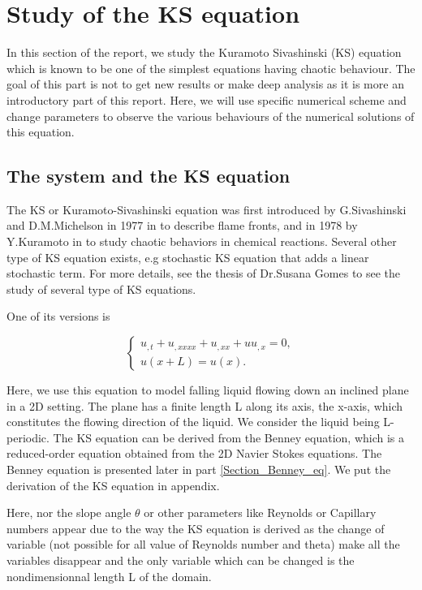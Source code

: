 \documentclass[12pt]{article}
\begin{document}
\newpage
\section{Study of the KS equation}\label{Section_KS_eq}


In this section of the report, we study the Kuramoto Sivashinski (KS) equation which is known to be one of the simplest equations having 
chaotic behaviour.  The goal of this part is not to get new results or make deep analysis as it is more an introductory part of this report. 
Here, we will use specific numerical scheme and change parameters to observe the various behaviours of the numerical solutions of this equation. 

\subsection{The system and the KS equation}

The KS or Kuramoto-Sivashinski equation was first introduced by G.Sivashinski and D.M.Michelson in 1977 in \cite{Shiv_Michelson_KS_eq} to describe 
flame fronts, and in 1978 by Y.Kuramoto in \cite{Kuramoto_KS_eq} to study chaotic behaviors in chemical reactions. Several other type of KS equation 
exists, e.g stochastic KS equation that adds a linear stochastic term. For more details, see the thesis of Dr.Susana Gomes \cite{Susana_thesis} to see the study 
of several type of KS equations.

One of its versions is

\begin{equation}\label{KS_eq_L}
\left\{
\begin{aligned}
    u_{,t} + u_{,xxxx}  + u_{,xx} + uu_{,x} = 0, \\
    u(x+L)=u(x). 
\end{aligned}
\right.
\end{equation}



Here, we use this equation to model falling liquid flowing down an inclined plane in a 2D setting. The plane has a finite length L along its axis, the x-axis, 
which constitutes the flowing direction of the liquid. We consider the liquid being L-periodic. The KS equation can be derived from the Benney equation, which 
is a reduced-order equation obtained from the 2D Navier Stokes equations. The Benney equation is presented later in part \ref{Section_Benney_eq}. We put the 
derivation of the KS equation in appendix. 

Here, nor the slope angle $\theta$ or other parameters like Reynolds or Capillary numbers appear due to the way the KS equation is derived as the change of 
variable (not possible for all value of Reynolds number and theta) make all the variables disappear and the only variable which can be changed is the nondimensionnal 
length L of the domain. 
\\
\end{document}
